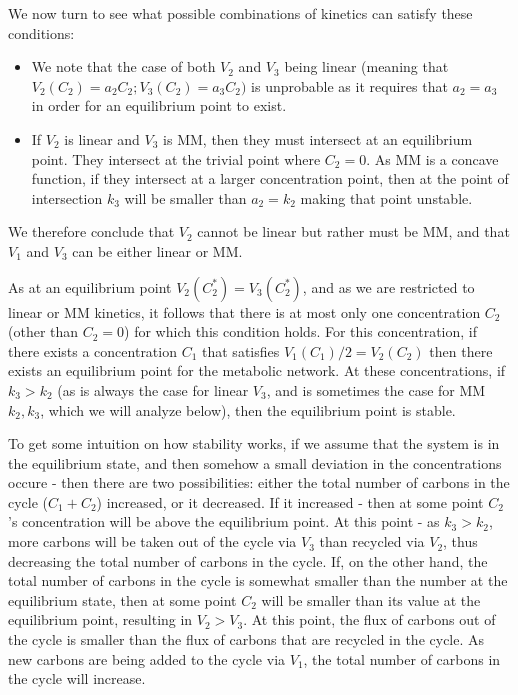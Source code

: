 \documentclass[a4page,notitlepage]{article}
\begin{document}
We now turn to see what possible combinations of kinetics can satisfy these conditions:
\begin{itemize}
\item We note that the case of both $V_2$ and $V_3$ being linear (meaning that $V_2(C_2)=a_2C_2;V_3(C_2)=a_3C_2)$ is unprobable as it requires that $a_2=a_3$ in order for an equilibrium point to exist.
\item If $V_2$ is linear and $V_3$ is MM, then they must intersect at an equilibrium point.
They intersect at the trivial point where $C_2=0$.
As MM is a concave function, if they intersect at a larger concentration point, then at the point of intersection $k_3$ will be smaller than $a_2=k_2$ making that point unstable.
\end{itemize}
We therefore conclude that $V_2$ cannot be linear but rather must be MM, and that $V_1$ and $V_3$ can be either linear or MM.

As at an equilibrium point $V_2(C_2^*)=V_3(C_2^*)$, and as we are restricted to linear or MM kinetics, it follows that there is at most only one concentration $C_2$ (other than $C_2=0$) for which this condition holds.
For this concentration, if there exists a concentration $C_1$ that satisfies $V_1(C_1)/2=V_2(C_2)$ then there exists an equilibrium point for the metabolic network.
At these concentrations, if $k_3>k_2$ (as is always the case for linear $V_3$, and is sometimes the case for MM $k_2,k_3$, which we will analyze below), then the equilibrium point is stable.

To get some intuition on how stability works, if we assume that the system is in the equilibrium state, and then somehow a small deviation in the concentrations occure - then there are two possibilities: either the total number of carbons in the cycle ($C_1+C_2$) increased, or it decreased.
If it increased - then at some point $C_2$'s concentration will be above the equilibrium point.
At this point - as $k_3>k_2$, more carbons will be taken out of the cycle via $V_3$ than recycled via $V_2$, thus decreasing the total number of carbons in the cycle.
If, on the other hand, the total number of carbons in the cycle is somewhat smaller than the number at the equilibrium state, then at some point $C_2$ will be smaller than its value at the equilibrium point, resulting in $V_2>V_3$.
At this point, the flux of carbons out of the cycle is smaller than the flux of carbons that are recycled in the cycle.
As new carbons are being added to the cycle via $V_1$, the total number of carbons in the cycle will increase.
\end{document}
